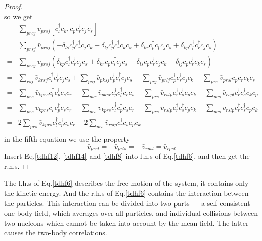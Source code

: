 \begin{proof}
\begin{equation}
    \end{equation}
    so we get
    \begin{equation}
      \begin{aligned}
         & \sum_{prsj}\bar{v}_{prsj}[c_{l}^{\dagger} c_{k}, c_{p}^{\dagger} c_{r}^{\dagger} c_{j} c_{s}]\\
        =& \sum_{prsj}\bar{v}_{prsj}(-\delta_{ls}c_p^\dagger c_r^\dagger c_j c_k -\delta_{lj}c_p^\dagger c_r^\dagger c_k c_s + \delta_{kr}c_p^\dagger c_l^\dagger c_j c_s + \delta_{kp}c_l^\dagger c_r^\dagger c_j c_s)\\
        =& \sum_{prsj}\bar{v}_{prsj}(\delta_{kp}c_l^\dagger c_r^\dagger c_j c_s + \delta_{kr}c_p^\dagger c_l^\dagger c_j c_s - \delta_{ls}c_p^\dagger c_r^\dagger c_j c_k -\delta_{lj}c_p^\dagger c_r^\dagger c_k c_s)\\
        =& \sum_{rsj}\bar{v}_{krsj}c_l^\dagger c_r^\dagger c_j c_s + \sum_{psj}\bar{v}_{pksj}c_p^\dagger c_l^\dagger c_j c_s - \sum_{prj}\bar{v}_{prlj}c_p^\dagger c_r^\dagger c_j c_k - \sum_{prs}\bar{v}_{prsl}c_p^\dagger c_r^\dagger c_k c_s\\
        =& \sum_{prs}\bar{v}_{kprs}c_l^\dagger c_p^\dagger c_s c_r + \sum_{psr}\bar{v}_{pksr}c_p^\dagger c_l^\dagger c_r c_s - \sum_{prs}\bar{v}_{rslp}c_r^\dagger c_s^\dagger c_p c_k - \sum_{prs}\bar{v}_{rspl}c_r^\dagger c_s^\dagger c_k c_p\\ 
        =& \sum_{prs}\bar{v}_{kprs}c_l^\dagger c_p^\dagger c_s c_r + \sum_{prs}\bar{v}_{kprs}c_l^\dagger c_p^\dagger c_s c_r - \sum_{prs}\bar{v}_{rslp}c_r^\dagger c_s^\dagger c_p c_k - \sum_{prs}\bar{v}_{rslp}c_r^\dagger c_s^\dagger c_p c_k\\
        =& 2\sum_{prs}\bar{v}_{kprs}c_l^\dagger c_p^\dagger c_s c_r - 2\sum_{prs}\bar{v}_{rslp}c_r^\dagger c_s^\dagger c_p c_k\\ \label{tdhf14}
      \end{aligned}
    \end{equation}
    in the fifth equation we use the property
    \begin{equation}
      \bar{v}_{prsl} = -\bar{v}_{prls} = -\bar{v}_{rpsl} = \bar{v}_{rpsl} \label{tdhf15}
    \end{equation}
    Insert Eq.\eqref{tdhf12}, \eqref{tdhf14} and \eqref{tdhf8} into l.h.s of Eq.\eqref{tdhf6}, and then get the r.h.s.
  \end{proof}

  The l.h.s of Eq.\eqref{tdhf6} describes the free motion of the system, it contains only the kinetic energy. And the r.h.s of Eq.\eqref{tdhf6} contains the interaction between the particles. This interaction can be divided into two parts --- a self-consistent one-body field, which averages over all particles, and individual collisions between two nucleons which cannot be taken into account by the mean field. The latter causes the two-body correlations.

